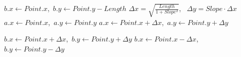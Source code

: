 \begin{algorithm}[tb!]
\begin{algorithmic}[1]
                \State $ b.x \gets Point.x $,~$ b.y \gets Point.y - Length $
            \EndCase
            \Default
                \State $ \Delta x = \sqrt{\frac{Length}{{1+Slope^2}}}$,~ $ \Delta y = Slope \cdot \Delta x $
                    \State $ a.x \gets Point.x $,~$ a.y \gets Point.y $
                \Else
                    \State $ a.x \gets Point.x + \Delta x $,~$ a.y \gets Point.y + \Delta y $
                \EndIf

                    \State $ b.x \gets Point.x + \Delta x $,~$ b.y \gets Point.y + \Delta y $
                \Else
                    \State $ b.x \gets Point.x - \Delta x $,~$ b.y \gets Point.y - \Delta y $
                \EndIf
                
            \EndDefault

        \EndSwitch

        \State {}

        \EndProcedure

    \end{algorithmic}
\end{algorithm}

